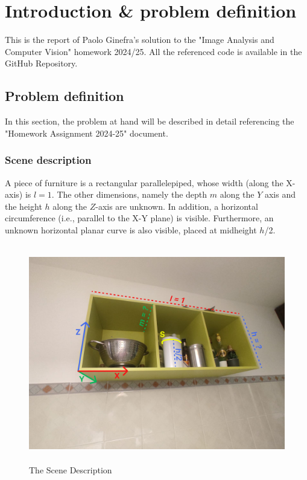\chapter*{Introduction \& problem definition}
This is the report of Paolo Ginefra's solution to the "Image Analysis and Computer Vision" homework 2024/25.
All the referenced code is available in the GitHub Repository.

\section{Problem definition}
In this section, the problem at hand will be described in detail referencing the "Homework Assignment 2024-25" document.
\subsection{Scene description}
 A piece of furniture is a rectangular parallelepiped, whose width (along the X-axis) is $l = 1$. 
The other dimensions, namely the depth $m$ along the $Y$ axis and the height $h$ along the $Z$-axis are 
unknown. In addition, a horizontal circumference (i.e., parallel to the X-Y plane) is visible. 
Furthermore, an unknown horizontal planar curve is also visible, placed at midheight $h$/2. 

\begin{figure}[!ht]
\centering
\includegraphics[height=9.5cm, width=\textwidth, keepaspectratio]{Report/Images/Introduction/SceneDescription.png}
\caption{\label{fig:SceneDescription}The Scene Description}
\end{figure}
